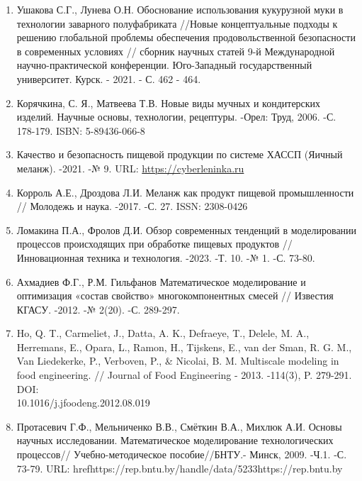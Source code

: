 \begin{references}
\begin{enumerate}
\def\labelenumi{\arabic{enumi}.}
\setcounter{enumi}{2}
\item
  Ушакова С.Г., Лунева О.Н. Обоснование использования кукурузной муки в
  технологии заварного полуфабриката //Новые концептуальные подходы к
  решению глобальной проблемы обеспечения продовольственной безопасности
  в современных условиях // сборник научных статей 9-й Международной
  научно-практической конференции. Юго-Западный государственный
  университет. Курск. - 2021. - С. 462 - 464.
\item
  Корячкина, С. Я., Матвеева Т.В. Новые виды мучных и кондитерских
  изделий. Научные основы, технологии, рецептуры. -Орел: Труд, 2006. -С.
  178-179. ISBN: 5-89436-066-8
\item
  Качество и безопасность пищевой продукции по системе ХАССП (Яичный
  меланж). -2021. -№ 9. URL:
  \href{https://cyberleninka.ru/article/n/kachestvo-i-bezopasnost-pischevoy-produktsii-po-sisteme-hassp-yaichnyy-melanzh}{https://cyberleninka.ru}
\item
  Корроль А.Е., Дроздова Л.И. Меланж как продукт пищевой промышленности
  // Молодежь и наука. -2017. -С. 27. ISSN: 2308-0426
\item
  Ломакина П.А., Фролов Д.И. Обзор современных тенденций в моделировании
  процессов происходящих при обработке пищевых продуктов //
  Инновационная техника и технология. -2023. -Т. 10. -№ 1. -С. 73-80.
\item
  Ахмадиев Ф.Г., Р.М. Гильфанов Математическое моделирование и
  оптимизация «состав свойство» многокомпонентных смесей // Известия
  КГАСУ. -2012. -№ 2(20). -С. 289-297.
\item
  Ho, Q. T., Carmeliet, J., Datta, A. K., Defraeye, T., Delele, M. A.,
  Herremans, E., Opara, L., Ramon, H., Tijskens, E., van der Sman, R. G.
  M., Van Liedekerke, P., Verboven, P., \& Nicolai, B. M. Multiscale
  modeling in food engineering. // Journal of Food Engineering - 2013.
  -114(3), P. 279-291. DOI: \\10.1016/j.jfoodeng.2012.08.019
\item
  Протасевич Г.Ф., Мельниченко В.В., Смёткин В.А., Михлюк А.И. Основы
  научных исследовании. Математическое моделирование технологических
  процессов// Учебно-методическое пособие//БНТУ.- Минск, 2009. -Ч.1. -С.
  73-79. URL: href{https://rep.bntu.by/handle/data/5233}{https://rep.bntu.by}
\end{enumerate}
\end{references}

